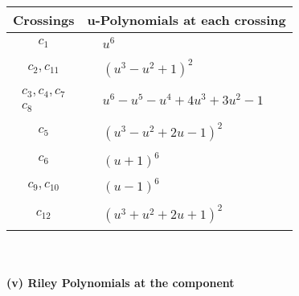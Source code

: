\documentclass[1p]{elsarticle_modified}
\theoremstyle{definition}
\begin{document}
\begin{tabular}{m{50pt}|m{274pt}}
Crossings & \hspace{64pt}u-Polynomials at each crossing \\
\hline $$\begin{aligned}c_{1}\end{aligned}$$&$\begin{aligned}
&u^6
\end{aligned}$\\
\hline $$\begin{aligned}c_{2},c_{11}\end{aligned}$$&$\begin{aligned}
&(u^3- u^2+1)^2
\end{aligned}$\\
\hline $$\begin{aligned}c_{3},c_{4},c_{7}\\c_{8}\end{aligned}$$&$\begin{aligned}
&u^6- u^5- u^4+4 u^3+3 u^2-1
\end{aligned}$\\
\hline $$\begin{aligned}c_{5}\end{aligned}$$&$\begin{aligned}
&(u^3- u^2+2 u-1)^2
\end{aligned}$\\
\hline $$\begin{aligned}c_{6}\end{aligned}$$&$\begin{aligned}
&(u+1)^6
\end{aligned}$\\
\hline $$\begin{aligned}c_{9},c_{10}\end{aligned}$$&$\begin{aligned}
&(u-1)^6
\end{aligned}$\\
\hline $$\begin{aligned}c_{12}\end{aligned}$$&$\begin{aligned}
&(u^3+u^2+2 u+1)^2
\end{aligned}$\\
\hline
\end{tabular}\\~\\
\newpage\renewcommand{\arraystretch}{1}
\flushleft \textbf{(v) Riley Polynomials at the component}\newline \\
\end{document}
